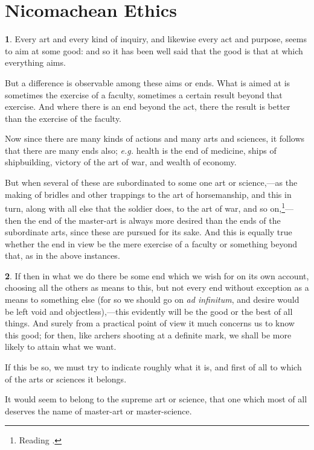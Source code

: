 
\author{Aristotle}
\chapter[Nicomachean Ethics, bk. 1, chaps. 1--7]{Nicomachean Ethics}

\noindent \textbf{1}. Every art and every kind of inquiry, and
likewise every act and purpose, seems to aim at some good: and so it
has been well said that the good is that at which everything aims.

But a difference is observable among these aims or ends. What is aimed
at is sometimes the exercise of a faculty, sometimes a certain result
beyond that exercise. And where there is an end beyond the act, there
the result is better than the exercise of the faculty.

Now since there are many kinds of actions and many arts and sciences,
it follows that there are many ends also; \textit{e.g.} health is the
end of medicine, ships of shipbuilding, victory of the art of war, and
wealth of economy.

But when several of these are subordinated to  some one art or
science,---as the making of bridles and other trappings to the art of
horsemanship, and this in turn, along with all else that the soldier
does, to the art of war, and so on,\footnote{Reading .}---then the end of the master-art is always more desired than the
ends of the subordinate arts, since these are pursued for its sake.
And this is equally true whether the end in view be the mere exercise
of a faculty or something beyond that, as in the above instances.

\textbf{2}. If then in what we do there be some end which we wish for
on its own account, choosing all the others as means to this, but not
every end without exception as a means to something else (for so we
should go on \textit{ad infinitum}, and desire would be left void and
objectless),---this evidently will be the good or the best of all
things. And surely from a practical point of view it much concerns us
to know this good; for then, like archers shooting at a definite mark,
we shall be more likely to attain what we want.

If this be so, we must try to indicate roughly what it is, and first
of all to which of the arts or sciences it belongs.

It would seem to belong to the supreme art or science, that one which
most of all deserves the name of master-art or master-science.

